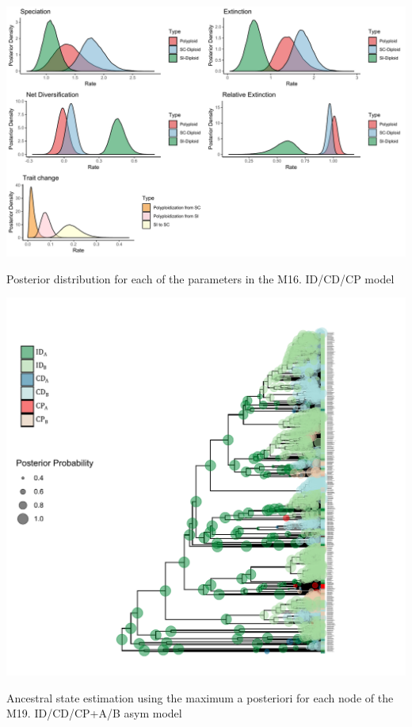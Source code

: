 \begin{suppfigure}
\includegraphics[width=\textwidth]{musseDPSInodipposteriordist.pdf}
\caption{Posterior distribution for each of the parameters in the  M16. ID/CD/CP model} %
\label{suppfigure:IDCDCPnodip}
\end{suppfigure}

\begin{suppfigure}
\includegraphics[width=\textwidth]{asrIDCDCPAB.pdf}
\caption{Ancestral state estimation using the maximum a posteriori for each node of the  M19. ID/CD/CP+A/B asym model} %
\label{suppfigure:IDCDCPnodipABasr}
\end{suppfigure}


